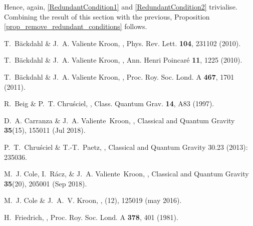 \documentclass[10pt,a4paper]{article}
\theoremstyle{plain}
\begin{document}
Hence, again, \eqref{RedundantCondition1} and \eqref{RedundantCondition2} trivialise. Combining the result of this section with the previous, Proposition \ref{prop_remove_redundant_conditions} follows.




\begin{thebibliography}{10}

T.~B\"{a}ckdahl \& J.~A. {Valiente Kroon},
,
\newblock Phys. Rev. Lett. {\bf 104}, 231102 (2010).

T.~B\"{a}ckdahl \& J.~A. {Valiente Kroon},
,
\newblock Ann. Henri Poincar\'e {\bf 11}, 1225 (2010).

T.~B\"{a}ckdahl \& J.~A. {Valiente Kroon},
,
\newblock Proc. Roy. Soc. Lond. A {\bf 467}, 1701 (2011).

R.~Beig \& P.~T. Chru\'{s}ciel,
,
\newblock Class. Quantum Grav. {\bf 14}, A83 (1997).

D.~A. Carranza \& J.~A. Valiente~Kroon,
,
\newblock Classical and Quantum Gravity {\bf 35}(15), 155011 (Jul 2018).

P.~T.~Chru\'{s}ciel \& T.-T.~Paetz, 
,
\newblock Classical and Quantum Gravity 30.23 (2013): 235036.

M.~J. Cole, I.~Rácz, \& J.~A. Valiente~Kroon,
,
\newblock Classical and Quantum Gravity {\bf 35}(20), 205001 (Sep 2018).

M.~J. Cole \& J.~A.~V. Kroon,
,
(12), 125019 (may 2016).

H.~Friedrich,
,
\newblock Proc. Roy. Soc. Lond. A {\bf 378}, 401 (1981).


\end{thebibliography}
\end{document}
